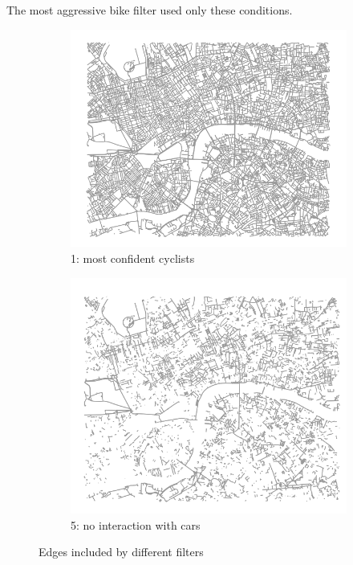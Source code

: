 \documentclass[11pt]{article} %
\begin{document}
The most aggressive bike filter used only these conditions.


\begin{figure}
\centering
\begin{subfigure}{.5\textwidth}
  \centering
  \includegraphics[width=1\linewidth]{bbox_bike_1_filter_cropped}
  \caption{1: most confident cyclists}
  \label{fig:sub1}
\end{subfigure}
\begin{subfigure}{.5\textwidth}
  \centering
  \includegraphics[width=1\linewidth]{bbox_bike_5_filter_cropped}
  \caption{5: no interaction with cars }
  \label{fig:sub2}
\end{subfigure}
\caption{Edges included by different filters}
\label{fig:test}
\end{figure}
\end{document}
